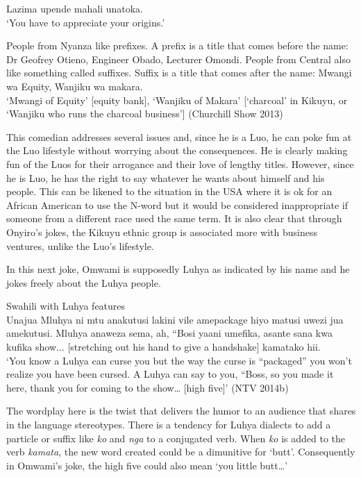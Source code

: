\documentclass[output=paper]{langsci/langscibook}
\begin{document}
\ea
 Lazima upende mahali unatoka.\\
\glt ‘You have to appreciate your origins.’ 
\z

\ea
 People from Nyanza like prefixes. A prefix is a title that comes before the name: Dr Geofrey Otieno, Engineer Obado, Lecturer Omondi. People from Central also like something called suffixes. Suffix is a title that comes after the name: Mwangi wa Equity, Wanjiku wa makara.\\
\glt ‘Mwangi of Equity’ [equity bank], ‘Wanjiku of Makara’ [‘charcoal’ in Kikuyu, or ‘Wanjiku who runs the charcoal business’] ({Churchill Show 2013})
\z

This comedian addresses several issues and, since he is a Luo, he can poke fun at the Luo lifestyle without worrying about the consequences. He is clearly making fun of the Luos for their arrogance and their love of lengthy titles. However, since he is Luo, he has the right to say whatever he wants about himself and his people. This can be likened to the situation in the USA where it is ok for an African American to use the N-word but it would be considered inappropriate if someone from a different race used the same term. It is also clear that through Onyiro’s jokes, the Kikuyu ethnic group is associated more with business ventures, unlike the Luo’s lifestyle. 

In this next joke, Omwami is supposedly Luhya as indicated by his name and he jokes freely about the Luhya people.

\ea
{Swahili with Luhya features}\\
 Unajua Mluhya ni mtu anakutusi lakini vile amepackage hiyo matusi uwezi jua amekutusi. Mluhya anaweza sema, ah, “Bosi yaani umefika, asante sana kwa kufika show... \textup{[stretching out his hand to give a handshake] }kamatako hii.\\
‘You know a Luhya can curse you but the way the curse is “packaged” you won’t realize you have been cursed. A Luhya can say to you, “Boss, so you made it here, thank you for coming to the show… [high five]’ (NTV 2014b)
\z

The wordplay here is the twist that delivers the humor to an audience that shares in the language stereotypes. There is a tendency for Luhya dialects to add a particle or suffix like \textit{ko} and \textit{nga} to a conjugated verb. When \textit{ko} is added to the verb \textit{kamata}, the new word created could be a dimunitive for ‘butt’. Consequently in Omwami’s joke, the high five could also mean ‘you little butt…’
\end{document}
